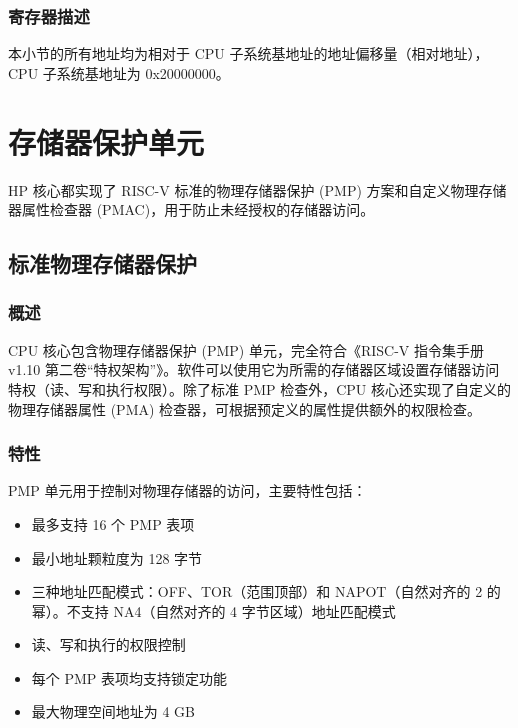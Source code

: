 \documentclass[main\_\_CN.tex]{subfiles}
\begin{document}



\subsubsection{寄存器描述}

本小节的所有地址均为相对于 CPU 子系统基地址的地址偏移量（相对地址），CPU 子系统基地址为 0x20000000。




\newpage
\section{存储器保护单元}
HP 核心都实现了 RISC-V 标准的物理存储器保护 (PMP) 方案和自定义物理存储器属性检查器 (PMAC)，用于防止未经授权的存储器访问。


\subsection{标准物理存储器保护}
\label{sec:riscvcpu-pmp}
\subsubsection{概述}
\label{sec:riscvcpu-pmp-overview}
CPU 核心包含物理存储器保护 (PMP) 单元，完全符合《RISC-V 指令集手册 v1.10 第二卷“特权架构”》。软件可以使用它为所需的存储器区域设置存储器访问特权（读、写和执行权限）。除了标准 PMP 检查外，CPU 核心还实现了自定义的物理存储器属性 (PMA) 检查器，可根据预定义的属性提供额外的权限检查。

\subsubsection{特性}
\label{sec:riscvcpu-pmp-features}

PMP 单元用于控制对物理存储器的访问，主要特性包括：

\begin{itemize}
    \item 最多支持 16 个 PMP 表项
    \item 最小地址颗粒度为 128 字节
    \item 三种地址匹配模式：OFF、TOR（范围顶部）和 NAPOT（自然对齐的 2 的幂）。不支持 NA4（自然对齐的 4 字节区域）地址匹配模式
    \item 读、写和执行的权限控制
    \item 每个 PMP 表项均支持锁定功能
    \item 最大物理空间地址为 4 GB
\end{itemize}
\end{document}
